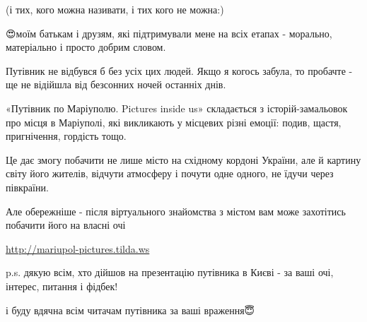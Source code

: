 (і тих, кого можна називати, і тих кого не можна:)

😍моїм батькам і друзям, які підтримували мене на всіх етапах - морально,
матеріально і просто добрим словом.

Путівник не відбувся б без усіх цих людей. Якщо я когось забула, то пробачте -
ще не відійшла від безсонних ночей останніх днів.

«Путівник по Маріуполю. Pictures inside us» складається з історій-замальовок
про місця в Маріуполі, які викликають у місцевих різні емоції: подив, щастя,
пригнічення, гордість тощо.

Це дає змогу побачити не лише місто на східному кордоні України, але й картину
світу його жителів, відчути атмосферу і почути одне одного, не їдучи через
півкраїни.

Але обережніше - після віртуального знайомства з містом вам може захотітись
побачити його на власні очі🤩

\url{http://mariupol-pictures.tilda.ws}

p.s. дякую всім, хто дійшов на презентацію путівника в Києві - за ваші очі,
інтерес, питання і фідбек!

і буду вдячна всім читачам путівника за ваші враження😇

